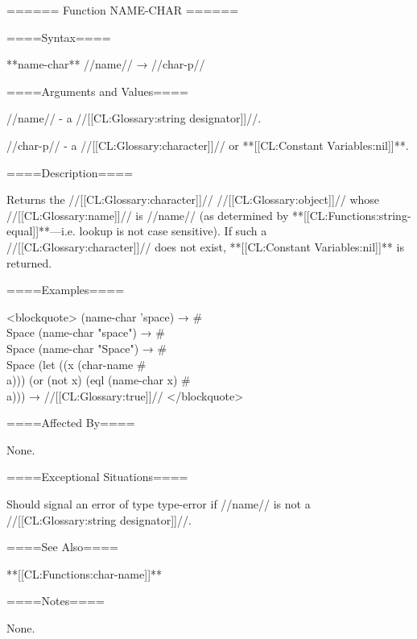 ====== Function NAME-CHAR ======

====Syntax====

**name-char** //name// → //char-p//

====Arguments and Values====

//name// - a //[[CL:Glossary:string designator]]//.

//char-p// - a //[[CL:Glossary:character]]// or **[[CL:Constant Variables:nil]]**.

====Description====

Returns the //[[CL:Glossary:character]]// //[[CL:Glossary:object]]// whose //[[CL:Glossary:name]]// is //name// (as determined by **[[CL:Functions:string-equal]]**---i.e. lookup is not case sensitive). If such a //[[CL:Glossary:character]]// does not exist, **[[CL:Constant Variables:nil]]** is returned.

====Examples====

<blockquote> (name-char 'space) → #\\Space (name-char "space") → #\\Space (name-char "Space") → #\\Space (let ((x (char-name #\\a))) (or (not x) (eql (name-char x) #\\a))) → //[[CL:Glossary:true]]// </blockquote>

====Affected By====

None.

====Exceptional Situations====

Should signal an error of type type-error if //name// is not a //[[CL:Glossary:string designator]]//.

====See Also====

**[[CL:Functions:char-name]]**

====Notes====

None.

